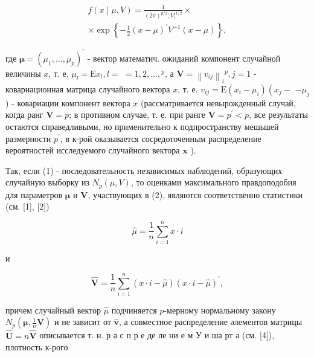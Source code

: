 \documentclass[10pt]{article}
\begin{document}
\[

\begin{gathered}

f(x \mid \mu, V)=\frac{1}{(2 \pi)^{p / 2} ;\left.V\right|^{1 / 2}} \times \\

\times \exp \left\{-\frac{1}{2}(x-\mu)^{\prime} V^{-1}(x-\mu)\right\},

\end{gathered}

\]



где $\boldsymbol{\mu}=\left(\mu_{1}, \ldots, \mu_{p}\right)^{\prime}$ - вектор математич. ожиданий компонент случайной величины $x$, т. е. $\mu_{l}=\mathrm{E} x_{l}, l=$ $=1,2, \ldots,{ }^{p}$, а $\boldsymbol{V}=\left\|v_{i j}\right\|_{i}{ }^{p}, j=1$ - ковариационная матрица случайного вектора $x$, т. е. $v_{i j}=\mathrm{E}\left(x_{i}-\mu_{i}\right)\left(x_{j}-\right.$ $-\mu_{j}$ ) - ковариации компонент вектора $x$ (рассматривается невырожденный случай, когда ранг $\boldsymbol{V}=p$; в противном случае, т. е. при ранге $\boldsymbol{V}=p^{\prime}<p$, все результаты остаются справедливыми, но применительно к подпространству мешьшей размерности $p^{\prime}$, в к-рой оказывается сосредоточенным распределение вероятностей исследуемого случайного вектора $\boldsymbol{x}$ ).



Так, если (1) - последовательность независимых наблюдений, образующих случайную выборку из $N_{p}(\mu, V)$, то оценками максимального правдоподобия для параметров $\boldsymbol{\mu}$ и $\boldsymbol{V}$, участвующих в (2), являются соответственно статистики (см. [1], [2])



\[

\hat{\mu}=\frac{1}{n} \sum_{i=1}^{n} x \cdot i

\]



и



\[

\hat{\boldsymbol{V}}=\frac{1}{n} \sum_{i=1}^{n}(x \cdot i-\hat{\mu})(x \cdot i-\hat{\mu})^{\prime},

\]



причем случайный вектор $\hat{\mu}$ подчиняется $p$-мерному нормальному закону $N_{p}\left(\boldsymbol{\mu}, \frac{1}{n} \boldsymbol{V}\right)$ и не зависит от $\hat{\boldsymbol{v}}$, а совместное распределение әлементов матрицы $\hat{\boldsymbol{U}}=n \hat{\boldsymbol{V}}$ описывается т. н. р а с п р е де ле ни е м У и ша рт а (см. [4]), плотность к-рого
\end{document}
